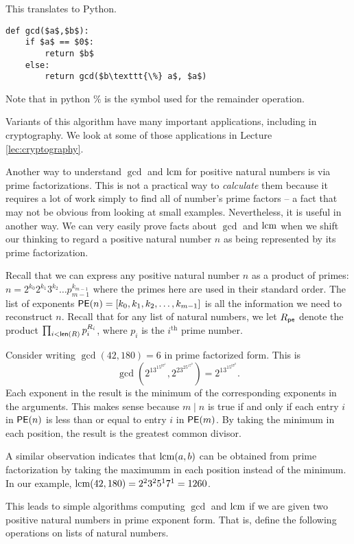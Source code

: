 This translates to Python.
\begin{code}
\begin{lstlisting}
def gcd($a$,$b$):
    if $a$ == $0$:
        return $b$
    else:
        return gcd($b\texttt{\%} a$, $a$)
\end{lstlisting}

\noindent Note that in python $\texttt{\%}$ is the symbol used for the remainder operation.
\end{code}

Variants of this algorithm have many important applications, including in cryptography. We look at some of those applications in Lecture \ref{lec:cryptography}.

Another way to understand $\gcd$ and $\operatorname{lcm}$ for positive natural numbers is via prime factorizations. 
This is not a practical way to \emph{calculate} them because it requires a lot of work simply to find all of number's prime factors -- a fact that may not be obvious from looking at small examples. Nevertheless, it is useful in another way. We can very easily prove facts about $\gcd$ and $\operatorname{lcm}$ when we shift our thinking to regard a positive natural number $n$ as being represented by its prime factorization.

Recall that we can express any positive natural number $n$ as a product of primes: 
$n = 2^{k_0}2^{k_1}3^{k_2}\dots p_{m-1}^{k_{m-1}}$ where the primes here are used in their standard order. The list of exponents $\mathord{\textsf{PE}}(n) = [k_0,k_1,k_2,\dots,k_{m-1}]$ is all the information we need to reconstruct $n$. Recall that for any list of natural numbers, we let $R_{\mathord{\textsf{pe}}}$ denote
the product $\prod_{i<\mathord{\textsf{len}}(R)} p_i^{R_i}$, where $p_i$ is the $i^{\text{th}}$ prime number.

Consider writing $\gcd(42,180)=6$ in prime factorized form. 
This is \[\gcd(2^13^15^07^1, 2^23^25^17^0) = 2^13^15^07^0.\] 
Each exponent in the result is the minimum of the corresponding exponents in the arguments. 
This makes sense because $m\mid n$ is true if and only if each entry $i$ in $\mathord{\textsf{PE}}(n)$ is less than or equal to entry $i$ in $\mathord{\textsf{PE}}(m)$.
By taking the minimum in each position, the result is the greatest common divisor.

A similar observation indicates that $\operatorname{lcm}(a,b)$ can be obtained from prime factorization by taking the maximumm in each position instead of the minimum. In our example,
$\operatorname{lcm}(42,180) = 2^23^25^17^1 = 1260$.

This leads to simple algorithms computing $\gcd$ and $\operatorname{lcm}$ if we are given two positive natural numbers in prime exponent form. That is, define the following operations on lists of natural numbers.


